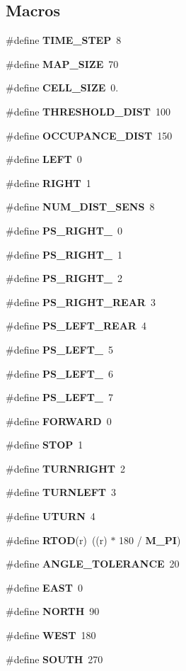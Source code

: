 \subsection*{Macros}
\begin{DoxyCompactItemize}
\item 
\#define {\bf T\-I\-M\-E\-\_\-\-S\-T\-E\-P}~8
\item 
\#define {\bf M\-A\-P\-\_\-\-S\-I\-Z\-E}~70
\item 
\#define {\bf C\-E\-L\-L\-\_\-\-S\-I\-Z\-E}~0.
\item 
\#define {\bf T\-H\-R\-E\-S\-H\-O\-L\-D\-\_\-\-D\-I\-S\-T}~100
\item 
\#define {\bf O\-C\-C\-U\-P\-A\-N\-C\-E\-\_\-\-D\-I\-S\-T}~150
\item 
\#define {\bf L\-E\-F\-T}~0
\item 
\#define {\bf R\-I\-G\-H\-T}~1
\item 
\#define {\bf N\-U\-M\-\_\-\-D\-I\-S\-T\-\_\-\-S\-E\-N\-S}~8
\item 
\#define {\bf P\-S\-\_\-\-R\-I\-G\-H\-T\-\_}~0
\item 
\#define {\bf P\-S\-\_\-\-R\-I\-G\-H\-T\-\_}~1
\item 
\#define {\bf P\-S\-\_\-\-R\-I\-G\-H\-T\-\_}~2
\item 
\#define {\bf P\-S\-\_\-\-R\-I\-G\-H\-T\-\_\-\-R\-E\-A\-R}~3
\item 
\#define {\bf P\-S\-\_\-\-L\-E\-F\-T\-\_\-\-R\-E\-A\-R}~4
\item 
\#define {\bf P\-S\-\_\-\-L\-E\-F\-T\-\_}~5
\item 
\#define {\bf P\-S\-\_\-\-L\-E\-F\-T\-\_}~6
\item 
\#define {\bf P\-S\-\_\-\-L\-E\-F\-T\-\_}~7
\item 
\#define {\bf F\-O\-R\-W\-A\-R\-D}~0
\item 
\#define {\bf S\-T\-O\-P}~1
\item 
\#define {\bf T\-U\-R\-N\-R\-I\-G\-H\-T}~2
\item 
\#define {\bf T\-U\-R\-N\-L\-E\-F\-T}~3
\item 
\#define {\bf U\-T\-U\-R\-N}~4
\item 
\#define {\bf R\-T\-O\-D}(r)~((r) $\ast$ 180 / {\bf M\-\_\-\-P\-I})
\item 
\#define {\bf A\-N\-G\-L\-E\-\_\-\-T\-O\-L\-E\-R\-A\-N\-C\-E}~20
\item 
\#define {\bf E\-A\-S\-T}~0
\item 
\#define {\bf N\-O\-R\-T\-H}~90
\item 
\#define {\bf W\-E\-S\-T}~180
\item 
\#define {\bf S\-O\-U\-T\-H}~270
\end{DoxyCompactItemize}
